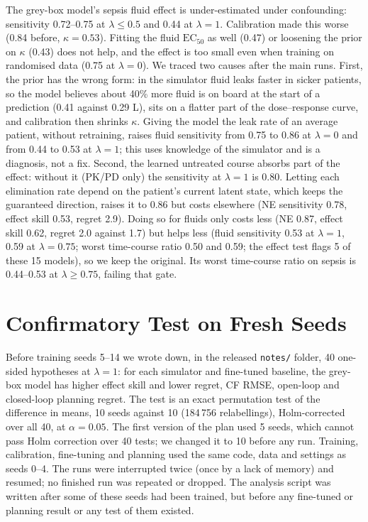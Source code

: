 \documentclass[letterpaper]{article}
\begin{document}
The grey-box model's sepsis fluid effect is under-estimated under confounding: sensitivity 0.72--0.75 at $\lambda\le0.5$ and 0.44 at $\lambda=1$. Calibration made this worse (0.84 before, $\kappa=0.53$). Fitting the fluid $\mathrm{EC}_{50}$ as well (0.47) or loosening the prior on $\kappa$ (0.43) does not help, and the effect is too small even when training on randomised data (0.75 at $\lambda=0$). We traced two causes after the main runs. First, the prior has the wrong form: in the simulator fluid leaks faster in sicker patients, so the model believes about 40\% more fluid is on board at the start of a prediction (0.41 against 0.29 L), sits on a flatter part of the dose--response curve, and calibration then shrinks $\kappa$. Giving the model the leak rate of an average patient, without retraining, raises fluid sensitivity from 0.75 to 0.86 at $\lambda=0$ and from 0.44 to 0.53 at $\lambda=1$; this uses knowledge of the simulator and is a diagnosis, not a fix. Second, the learned untreated course absorbs part of the effect: without it (PK/PD only) the sensitivity at $\lambda=1$ is 0.80. Letting each elimination rate depend on the patient's current latent state, which keeps the guaranteed direction, raises it to 0.86 but costs elsewhere (NE sensitivity 0.78, effect skill 0.53, regret 2.9). Doing so for fluids only costs less (NE 0.87, effect skill 0.62, regret 2.0 against 1.7) but helps less (fluid sensitivity 0.53 at $\lambda=1$, 0.59 at $\lambda=0.75$; worst time-course ratio 0.50 and 0.59; the effect test flags 5 of these 15 models), so we keep the original. Its worst time-course ratio on sepsis is 0.44--0.53 at $\lambda\ge0.75$, failing that gate.

\section{Confirmatory Test on Fresh Seeds}
\label{sec:confirm}

Before training seeds 5--14 we wrote down, in the released \texttt{notes/} folder, 40 one-sided hypotheses at $\lambda=1$: for each simulator and fine-tuned baseline, the grey-box model has higher effect skill and lower regret, CF RMSE, open-loop and closed-loop planning regret. The test is an exact permutation test of the difference in means, 10 seeds against 10 (184\,756 relabellings), Holm-corrected over all 40, at $\alpha=0.05$. The first version of the plan used 5 seeds, which cannot pass Holm correction over 40 tests; we changed it to 10 before any run. Training, calibration, fine-tuning and planning used the same code, data and settings as seeds 0--4. The runs were interrupted twice (once by a lack of memory) and resumed; no finished run was repeated or dropped. The analysis script was written after some of these seeds had been trained, but before any fine-tuned or planning result or any test of them existed.
\end{document}
